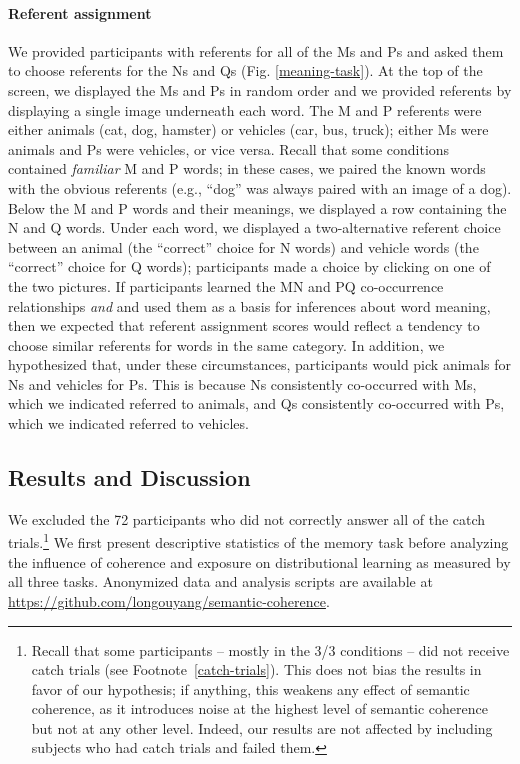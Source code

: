 \documentclass[man,longtable, floatmark]{my-apa6}
\begin{document}
\paragraph{Referent assignment}

We provided participants with referents for all of the Ms and Ps and asked them to choose referents for the Ns and Qs (Fig. \ref{meaning-task}). At the top of the screen, we displayed the Ms and Ps in random order and we provided referents by displaying a single image underneath each word. The M and P referents were either animals (cat, dog, hamster) or vehicles (car, bus, truck); either Ms were animals and Ps were vehicles, or vice versa. Recall that some conditions contained \emph{familiar} M and P words; in these cases, we paired the known words with the obvious referents (e.g., ``dog'' was always paired with an image of a dog). Below the M and P words and their meanings, we displayed a row containing the N and Q words. Under each word, we displayed a two-alternative referent choice between an animal (the ``correct'' choice for N words) and vehicle words (the ``correct'' choice for Q words); participants made a choice by clicking on one of the two pictures. If participants learned the MN and PQ co-occurrence relationships \emph{and} and used them as a basis for inferences about word meaning, then we expected that referent assignment scores would reflect a tendency to choose similar referents for words in the same category. In addition, we hypothesized that, under these circumstances, participants would pick animals for Ns  and vehicles for Ps. This is because Ns consistently co-occurred with Ms, which we indicated referred to animals, and Qs consistently co-occurred with Ps, which we indicated referred to vehicles.

\subsection{Results and Discussion}
We excluded the 72 participants who did not correctly answer all of the catch trials.\footnote{ Recall that some participants -- mostly in the 3/3 conditions --  did not receive catch trials (see Footnote~\ref{catch-trials}). This does not bias the results in favor of our hypothesis; if anything, this weakens any effect of semantic coherence, as it introduces noise at the highest level of semantic coherence but not at any other level. Indeed, our results are not affected by including subjects who had catch trials and failed them.} We first present descriptive statistics of the memory task before analyzing the influence of coherence and exposure on distributional learning as measured by all three tasks. Anonymized data and analysis scripts are available at \href{https://github.com/longouyang/semantic-coherence}{https://github.com/longouyang/semantic-coherence}.
\end{document}
